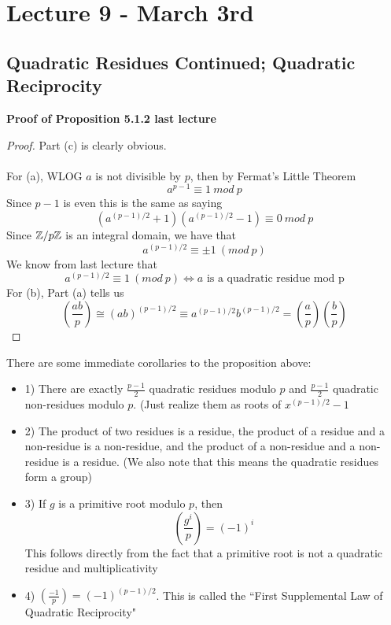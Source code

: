 \section{Lecture 9 - March 3rd}

\subsection{Quadratic Residues Continued; Quadratic Reciprocity}

{\bf Proof of Proposition 5.1.2 last lecture}

\begin{proof}
Part (c) is clearly obvious.\\\\
For (a), WLOG $a$ is not divisible by $p$, then by Fermat's Little Theorem
\[a^{p-1} \equiv 1\ mod\ p\]
Since $p-1$ is even this is the same as saying
\[(a^{(p-1)/2} + 1)(a^{(p-1)/2} - 1) \equiv 0\ mod\ p\]
Since $\mathbb{Z}/p\mathbb{Z}$ is an integral domain, we have that
\[a^{(p-1)/2} \equiv \pm 1\ (mod\ p)\]
We know from last lecture that
\[a^{(p-1)/2} \equiv 1\ (mod\ p) \iff a \text{ is a quadratic residue mod p}\]
For (b), Part (a) tells us
\[(\frac{ab}{p}) \cong (ab)^{(p-1)/2} \equiv a^{(p-1)/2} b^{(p-1)/2} = (\frac{a}{p})(\frac{b}{p})\]
\end{proof}

\begin{corollary}
There are some immediate corollaries to the proposition above:
\begin{itemize}
    \item 1) There are exactly $\frac{p-1}{2}$ quadratic residues modulo $p$ and $\frac{p-1}{2}$ quadratic non-residues modulo $p$. (Just realize them as roots of $x^{(p-1)/2} - 1$
    \item 2) The product of two residues is a residue, the product of a residue and a non-residue is a non-residue, and the product of a non-residue and a non-residue is a residue. (We also note that this means the quadratic residues form a group)
    \item 3) If $g$ is a primitive root modulo $p$, then
    \[(\frac{g^i}{p}) = (-1)^i\]
    This follows directly from the fact that a primitive root is not a quadratic residue and multiplicativity
    \item 4) $(\frac{-1}{p}) = (-1)^{(p-1)/2}$. This is called the ``First Supplemental Law of Quadratic Reciprocity"
\end{itemize}
\end{corollary}

